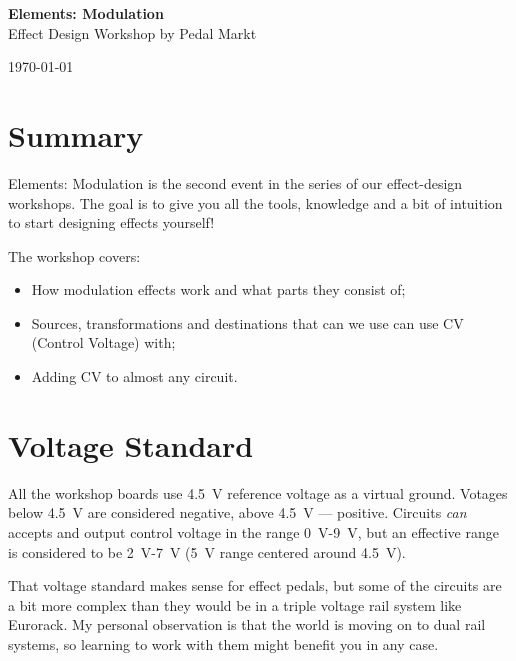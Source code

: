 \documentclass[a4paper,12pt]{article}
\begin{document}
\begin{titlepage}
  \begin{center}
    \Large\textbf{Elements: Modulation}\\
    \large{Effect Design Workshop by Pedal Markt}
  \end{center}
  \vspace*{\fill}
  \begin{center}
    \today
  \end{center}
\end{titlepage}

\section{Summary}

Elements: Modulation is the second event in the series of
our effect-design workshops. The goal is to give you all the
tools, knowledge and a bit of intuition to start designing
effects yourself!

The workshop covers:

\begin{itemize}
  \item How modulation effects work and what parts they
    consist of;
  \item Sources, transformations and destinations that can
    we use can use CV (Control Voltage) with;
  \item Adding CV to almost any circuit.
\end{itemize}

\section{Voltage Standard}\label{voltage}

All the workshop boards use \SI{4.5}{\V} reference voltage
as a virtual ground. Votages below \SI{4.5}{\V} are
considered negative, above \SI{4.5}{\V} --- positive.
Circuits \textit{can} accepts and output control voltage in
the range \SI{0}{\V}-\SI{9}{\V}, but an effective range is
considered to be \SI{2}{\V}-\SI{7}{\V} (\SI{5}{\V} range
centered around \SI{4.5}{\V}).

That voltage standard makes sense for effect pedals, but
some of the circuits are a bit more complex than they would
be in a triple voltage rail system like Eurorack. My
personal observation is that the world is moving on to
dual rail systems, so learning to work with them might
benefit you in any case.
\end{document}
